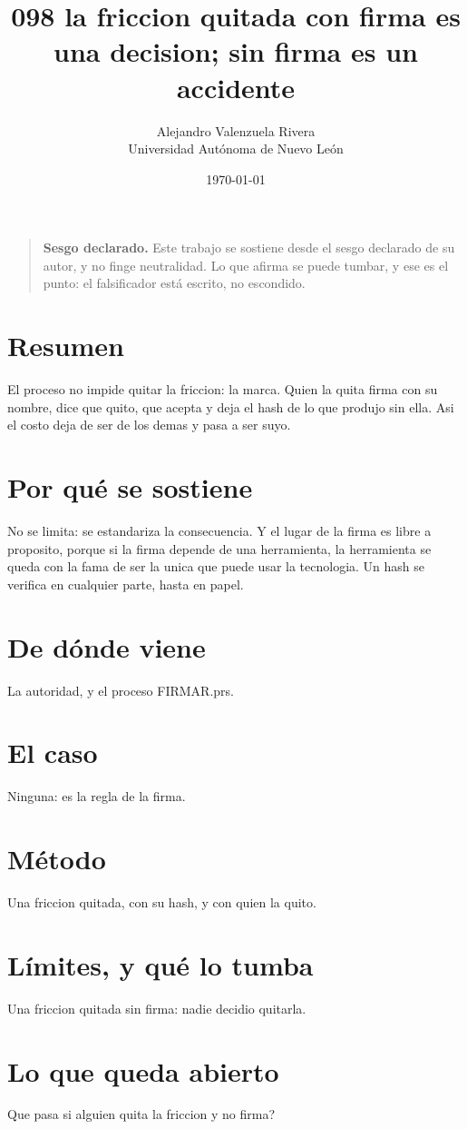 \documentclass[11pt,a4paper]{article}
\title{098 la friccion quitada con firma es una decision; sin firma es un accidente}
\author{Alejandro Valenzuela Rivera\\\small Universidad Autónoma de Nuevo León}
\date{\today}
\begin{document}
\maketitle

\begin{quote}
\textbf{Sesgo declarado.} Este trabajo se sostiene desde el sesgo declarado de su autor, y no finge neutralidad. Lo que afirma se puede tumbar, y ese es el punto: el falsificador está escrito, no escondido.
\end{quote}

\section*{Resumen}
El proceso no impide quitar la friccion: la marca. Quien la quita firma con su nombre, dice que quito, que acepta y deja el hash de lo que produjo sin ella. Asi el costo deja de ser de los demas y pasa a ser suyo.

\section{Por qué se sostiene}
No se limita: se estandariza la consecuencia. Y el lugar de la firma es libre a proposito, porque si la firma depende de una herramienta, la herramienta se queda con la fama de ser la unica que puede usar la tecnologia. Un hash se verifica en cualquier parte, hasta en papel.

\section{De dónde viene}
La autoridad, y el proceso FIRMAR.prs.

\section{El caso}
Ninguna: es la regla de la firma.

\section{Método}
Una friccion quitada, con su hash, y con quien la quito.

\section{Límites, y qué lo tumba}
Una friccion quitada sin firma: nadie decidio quitarla.

\section{Lo que queda abierto}
\textquestiondown{}Que pasa si alguien quita la friccion y no firma?
\end{document}
